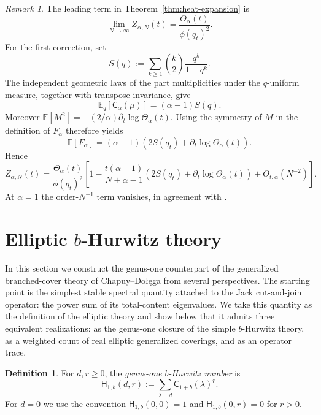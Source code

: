 \documentclass[11pt,a4paper,reqno]{article}
\theoremstyle{definition}
\newtheorem{definition}[theorem]{Definition}
\theoremstyle{remark}
\newtheorem{remark}[theorem]{Remark}
\newcommand\E{{\mathbb E}}
\newcommand\cA{{\mathsf C}}
\newcommand\Hb{{\mathsf H}}
\begin{document}
\begin{remark}
The leading term in Theorem~\ref{thm:heat-expansion} is
\[
\lim_{N\to\infty}Z_{\alpha,N}(t)=\frac{\Theta_{\alpha}(t)}{\phi(q_t)^2}.
\]
For the first correction, set
\begin{equation}\label{eq:S-q}
S(q):=\sum_{k\geq1}\binom{k}{2}\frac{q^k}{1-q^k}.
\end{equation}
The independent geometric laws of the part multiplicities under the $q$-uniform measure, together with transpose invariance, give
\begin{equation}\label{eq:mean-Jack-content}
\E_q[\cA_\alpha(\mu)]=(\alpha-1)S(q).
\end{equation}
Moreover $\E[M^2]=-(2/\alpha)\partial_t\log\Theta_\alpha(t)$.  Using the symmetry of $M$ in the definition of $F_\alpha$ therefore yields
\begin{equation}\label{eq:EF}
\E[F_\alpha]=(\alpha-1)\left(2S(q_t)+\partial_t\log\Theta_\alpha(t)\right).
\end{equation}
Hence
\begin{equation}\label{eq:first-correction-explicit}
Z_{\alpha,N}(t) =\frac{\Theta_\alpha(t)}{\phi(q_t)^2} \left[ 1-\frac{t(\alpha-1)}{N+\alpha-1} \left(2S(q_t)+\partial_t\log\Theta_\alpha(t)\right) +O_{t,\alpha}(N^{-2}) \right].
\end{equation}
At $\alpha=1$ the order-$N^{-1}$ term vanishes, in agreement with \cite{LM2}.
\end{remark}


\section{Elliptic \texorpdfstring{$b$}{b}-Hurwitz theory}\label{sec:elliptic-b-hurwitz}

In this section we construct the genus-one counterpart of the generalized branched-cover theory of Chapuy--Do\l\k{e}ga \cite{ChapuyDolega22} from several perspectives.  The starting point is the simplest stable spectral quantity attached to the Jack cut-and-join operator: the power sum of its total-content eigenvalues.  We take this quantity as the definition of the elliptic theory and show below that it admits three equivalent realizations: as the genus-one closure of the simple $b$-Hurwitz theory, as a weighted count of real elliptic generalized coverings, and as an operator trace.

\begin{definition}\label{def:Hb}
For $d,r\geq0$, the \emph{genus-one $b$-Hurwitz number} is
\begin{equation}\label{eq:Hb}
\Hb_{1,b}(d,r) :=\sum_{\lambda\vdash d}\cA_{1+b}(\lambda)^r.
\end{equation}
For $d=0$ we use the convention $\Hb_{1,b}(0,0)=1$ and $\Hb_{1,b}(0,r)=0$ for $r>0$.
\end{definition}
\end{document}
